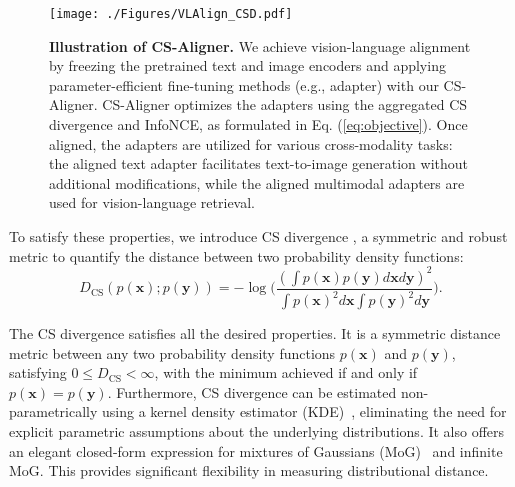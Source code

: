 \begin{figure*}[ht!]
\vspace{-2mm}
  \centering  \texttt{[image: ./Figures/VLAlign\_CSD.pdf]} %
\vspace{-3mm}
\caption{\textbf{Illustration of CS-Aligner.} We achieve vision-language alignment by freezing the pretrained text and image encoders and applying parameter-efficient fine-tuning methods (e.g., adapter) with our CS-Aligner. CS-Aligner optimizes the adapters using the aggregated CS divergence and InfoNCE, as formulated in Eq. (\ref{eq:objective}). 
Once aligned, the adapters are utilized for various cross-modality tasks: the aligned text adapter facilitates text-to-image generation without additional modifications, while the aligned multimodal adapters are used for vision-language retrieval.
}
\vspace{-4mm}
\label{fig:illustration}
\end{figure*}

To satisfy these properties, we introduce CS divergence \citep{principe2000information,principe2000learning}, a symmetric and robust metric to quantify the distance between two probability density functions:
\begin{equation}  
D_{\text{CS}}(p(\mathbf{x});p(\mathbf{y}))=-\log \Bigg(\frac{(\int p(\mathbf{x})p(\mathbf{y})d\mathbf{x}d\mathbf{y})^2}{\int p(\mathbf{x})^2d\mathbf{x} \int p(\mathbf{y})^2d\mathbf{y}} \Bigg).  
\label{eq.cs_divergence}  
\end{equation}  

The CS divergence satisfies all the desired properties.  It is a symmetric distance metric between any two probability density functions \(p(\mathbf{x})\) and \(p(\mathbf{y})\), satisfying \(0 \leq D_{\text{CS}} < \infty\), with the minimum achieved if and only if \(p(\mathbf{x}) = p(\mathbf{y})\). 
Furthermore, CS divergence can be estimated non-parametrically using a kernel density estimator (KDE)~\citep{parzen1962estimation}, eliminating the need for explicit parametric assumptions about the underlying distributions. It also offers an elegant closed-form expression for mixtures of Gaussians (MoG)~\cite{kampa2011closed} and infinite MoG.
This provides significant flexibility in measuring distributional distance.


